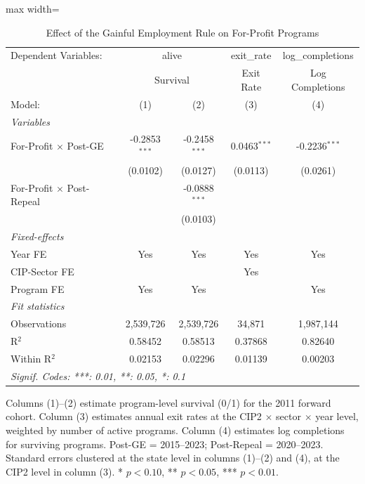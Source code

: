 
\begin{table}[htbp]
   \caption{\label{tab:main} Effect of the Gainful Employment Rule on For-Profit Programs}
   \centering
   \begin{adjustbox}{max width=\textwidth}
   \begin{tabular}{lcccc}
      \tabularnewline \midrule \midrule
      Dependent Variables: & \multicolumn{2}{c}{alive} & exit\_rate & log\_completions\\
       & \multicolumn{2}{c}{Survival} & Exit Rate & Log Completions \\ 
      Model:                           & (1)             & (2)             & (3)            & (4)\\  
      \midrule
      \emph{Variables}\\
      For-Profit $\times$ Post-GE      & -0.2853$^{***}$ & -0.2458$^{***}$ & 0.0463$^{***}$ & -0.2236$^{***}$\\   
                                       & (0.0102)        & (0.0127)        & (0.0113)       & (0.0261)\\   
      For-Profit $\times$ Post-Repeal  &                 & -0.0888$^{***}$ &                &   \\   
                                       &                 & (0.0103)        &                &   \\   
      \midrule
      \emph{Fixed-effects}\\
      Year FE                          & Yes             & Yes             & Yes            & Yes\\  
      CIP-Sector FE                    &                 &                 & Yes            & \\  
      Program FE                       & Yes             & Yes             &                & Yes\\  
      \midrule
      \emph{Fit statistics}\\
      Observations                     & 2,539,726       & 2,539,726       & 34,871         & 1,987,144\\  
      R$^2$                            & 0.58452         & 0.58513         & 0.37868        & 0.82640\\  
      Within R$^2$                     & 0.02153         & 0.02296         & 0.01139        & 0.00203\\  
      \midrule \midrule
      \multicolumn{5}{l}{\emph{Signif. Codes: ***: 0.01, **: 0.05, *: 0.1}}\\
   \end{tabular}
   \end{adjustbox}

   \par \raggedright 
   Columns (1)--(2) estimate program-level survival (0/1) for the 2011 forward cohort. Column (3) estimates annual exit rates at the CIP2 $\times$ sector $\times$ year level, weighted by number of active programs. Column (4) estimates log completions for surviving programs. Post-GE = 2015--2023; Post-Repeal = 2020--2023. Standard errors clustered at the state level in columns (1)--(2) and (4), at the CIP2 level in column (3). * $p<0.10$, ** $p<0.05$, *** $p<0.01$.
\end{table}


